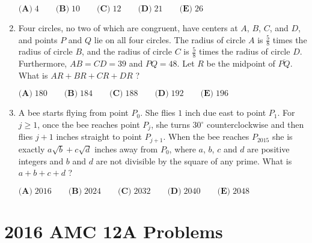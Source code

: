 \documentclass{article}
\begin{document}
\begin{enumerate}[label=\arabic*., itemsep=0.5em]
\(\textbf{(A)}\; 4 \qquad\textbf{(B)}\; 10 \qquad\textbf{(C)}\; 12 \qquad\textbf{(D)}\; 21 \qquad\textbf{(E)}\; 26\)\par \vspace{0.5em}\item Four circles, no two of which are congruent, have centers at \(A\), \(B\), \(C\), and \(D\), and points \(P\) and \(Q\) lie on all four circles. The radius of circle \(A\) is \(\tfrac{5}{8}\) times the radius of circle \(B\), and the radius of circle \(C\) is \(\tfrac{5}{8}\) times the radius of circle \(D\). Furthermore, \(AB = CD = 39\) and \(PQ = 48\). Let \(R\) be the midpoint of \(\overline{PQ}\). What is \(AR+BR+CR+DR\) ?

\(\textbf{(A)}\; 180 \qquad\textbf{(B)}\; 184 \qquad\textbf{(C)}\; 188 \qquad\textbf{(D)}\; 192\qquad\textbf{(E)}\; 196\)\par \vspace{0.5em}\item A bee starts flying from point \(P_0\). She flies \(1\) inch due east to point \(P_1\). For \(j \ge 1\), once the bee reaches point \(P_j\), she turns \(30^{\circ}\) counterclockwise and then flies \(j+1\) inches straight to point \(P_{j+1}\). When the bee reaches \(P_{2015}\) she is exactly \(a \sqrt{b} + c \sqrt{d}\) inches away from \(P_0\), where \(a\), \(b\), \(c\) and \(d\) are positive integers and \(b\) and \(d\) are not divisible by the square of any prime. What is \(a+b+c+d\) ?

\(\textbf{(A)}\; 2016 \qquad\textbf{(B)}\; 2024 \qquad\textbf{(C)}\; 2032 \qquad\textbf{(D)}\; 2040 \qquad\textbf{(E)}\; 2048\)\par \vspace{0.5em}
\end{enumerate}
\newpage\section*{2016 AMC 12A Problems}
\end{document}
